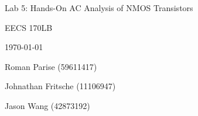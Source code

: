 \centering
\vspace{2.5cm}
{\huge Lab 5: Hands-On AC Analysis of NMOS Transistors \par}
{\Large EECS 170LB \par}
{\Large \today \par}
\vspace{1cm}
{\large Roman Parise (59611417) \par}
{\large Johnathan Fritsche (11106947) \par}
{\large Jason Wang (42873192) \par}
\vspace{1cm}
